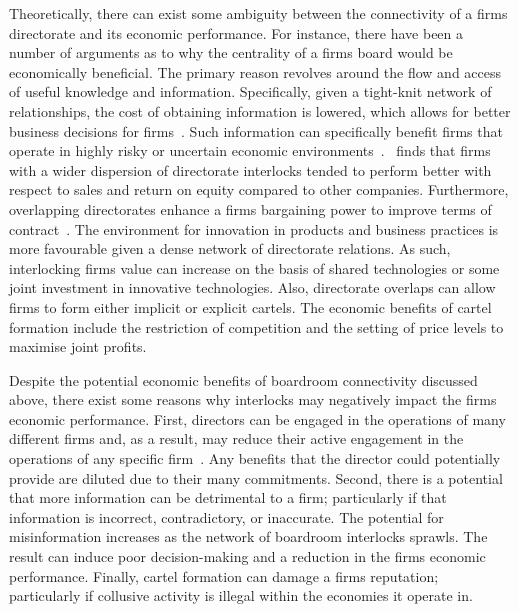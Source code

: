 \documentclass[11pt,fleqn]{article}
\begin{document}
Theoretically, there can exist some ambiguity between the connectivity of a firms directorate and its economic performance. For instance, there have been a number of arguments as to why the centrality of a firms board would be economically beneficial. The primary reason revolves around the flow and access of useful knowledge and information. Specifically, given a tight-knit network of relationships, the cost of obtaining information is lowered, which allows for better business decisions for firms~\citep{Mizruchi1990}. Such information can specifically benefit firms that operate in highly risky or uncertain economic environments~\citep{Mol2001, NicholsonAlexanderKiel2004}.~\citet{Boyd1990} finds that firms with a wider dispersion of directorate interlocks tended to perform better with respect to sales and return on equity compared to other companies. Furthermore, overlapping directorates enhance a firms bargaining power to improve terms of contract~\citep{SchoormanBazermanAtkin1981}. The environment for innovation in products and business practices is more favourable given a dense network of directorate relations. As such, interlocking firms value can increase on the basis of shared technologies or some joint investment in innovative technologies. Also, directorate overlaps can allow firms to form either implicit or explicit cartels. The economic benefits of cartel formation include the restriction of competition and the setting of price levels to maximise joint profits.

Despite the potential economic benefits of boardroom connectivity discussed above, there exist some reasons why interlocks may negatively impact the firms economic performance. First, directors can be engaged in the operations of many different firms and, as a result, may reduce their active engagement in the operations of any specific firm~\citep{FichShivdasani2006, FichWhite2005}. Any benefits that the director could potentially provide are diluted due to their many commitments. Second, there is a potential that more information can be detrimental to a firm; particularly if that information is incorrect, contradictory, or inaccurate. The potential for misinformation increases as the network of boardroom interlocks sprawls. The result can induce poor decision-making and a reduction in the firms economic performance. Finally, cartel formation can damage a firms reputation; particularly if collusive activity is illegal within the economies it operate in.
\end{document}

